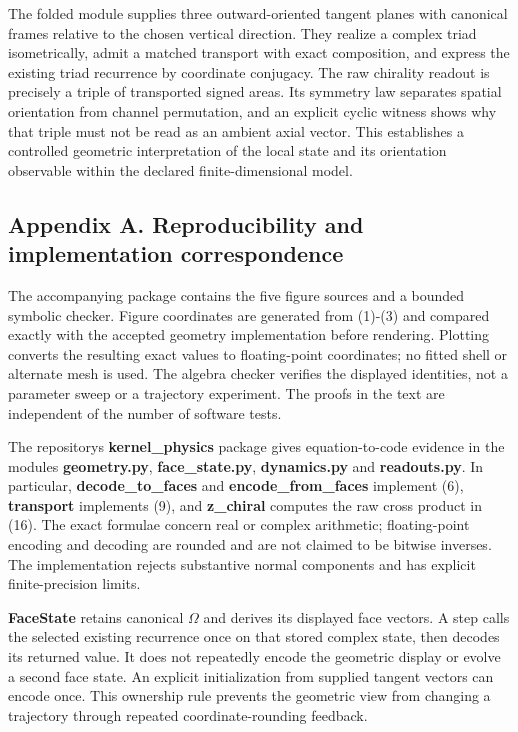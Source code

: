 \documentclass[
  11pt,
  a4paper,
]{article}
\begin{document}
The folded module supplies three outward-oriented tangent planes with canonical frames relative to the chosen vertical direction. They realize a complex triad isometrically, admit a matched transport with exact composition, and express the existing triad recurrence by coordinate conjugacy. The raw chirality readout is precisely a triple of transported signed areas. Its symmetry law separates spatial orientation from channel permutation, and an explicit cyclic witness shows why that triple must not be read as an ambient axial vector. This establishes a controlled geometric interpretation of the local state and its orientation observable within the declared finite-dimensional model.

\subsection{Appendix A. Reproducibility and implementation correspondence}\label{appendix-a.-reproducibility-and-implementation-correspondence}

The accompanying package contains the five figure sources and a bounded symbolic checker. Figure coordinates are generated from (1)-(3) and compared exactly with the accepted geometry implementation before rendering. Plotting converts the resulting exact values to floating-point coordinates; no fitted shell or alternate mesh is used. The algebra checker verifies the displayed identities, not a parameter sweep or a trajectory experiment. The proofs in the text are independent of the number of software tests.

The repository\textquotesingle s \textbf{kernel\_physics} package gives equation-to-code evidence in the modules \textbf{geometry.py}, \textbf{face\_state.py}, \textbf{dynamics.py} and \textbf{readouts.py}. In particular, \textbf{decode\_to\_faces} and \textbf{encode\_from\_faces} implement (6), \textbf{transport} implements (9), and \textbf{z\_chiral} computes the raw cross product in (16). The exact formulae concern real or complex arithmetic; floating-point encoding and decoding are rounded and are not claimed to be bitwise inverses. The implementation rejects substantive normal components and has explicit finite-precision limits.

\textbf{FaceState} retains canonical \(\Omega\) and derives its displayed face vectors. A step calls the selected existing recurrence once on that stored complex state, then decodes its returned value. It does not repeatedly encode the geometric display or evolve a second face state. An explicit initialization from supplied tangent vectors can encode once. This ownership rule prevents the geometric view from changing a trajectory through repeated coordinate-rounding feedback.
\end{document}
